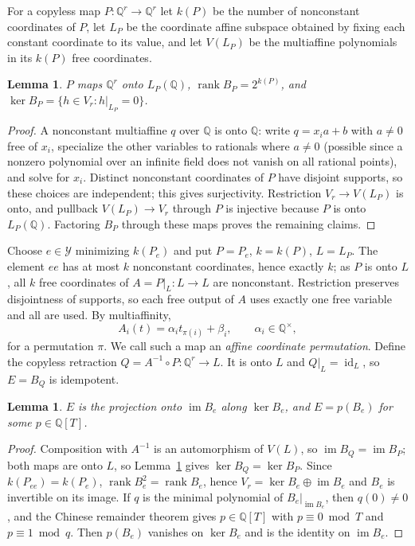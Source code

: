 \documentclass[acmlarge,screen,11pt,nonacm,natbib=false]{acmart}
\newcommand{\Q}{\mathbb{Q}}
\newcommand{\cY}{\mathcal{Y}}
\newcommand{\im}{\operatorname{im}}
\newcommand{\id}{\operatorname{id}}
\newtheorem{lemma}[theorem]{Lemma}
\theoremstyle{definition}
\begin{document}
For a copyless map $P:\Q^r\to\Q^r$ let $k(P)$ be the number of nonconstant coordinates of $P$, let $L_P$ be the coordinate affine subspace obtained by fixing each constant coordinate to its value, and let $V(L_P)$ be the multiaffine polynomials in its $k(P)$ free coordinates.

\begin{lemma}\label{lem:image}
$P$ maps $\Q^r$ onto $L_P(\Q)$, $\operatorname{rank}B_P=2^{k(P)}$, and $\ker B_P=\{h\in V_r:h|_{L_P}=0\}$.
\end{lemma}
\begin{proof}
A nonconstant multiaffine $q$ over $\Q$ is onto $\Q$: write $q=x_ia+b$ with $a\ne0$ free of $x_i$, specialize the other variables to rationals where $a\ne0$ (possible since a nonzero polynomial over an infinite field does not vanish on all rational points), and solve for $x_i$. Distinct nonconstant coordinates of $P$ have disjoint supports, so these choices are independent; this gives surjectivity. Restriction $V_r\to V(L_P)$ is onto, and pullback $V(L_P)\to V_r$ through $P$ is injective because $P$ is onto $L_P(\Q)$. Factoring $B_P$ through these maps proves the remaining claims.
\end{proof}

Choose $e\in\cY$ minimizing $k(P_e)$ and put $P=P_e$, $k=k(P)$, $L=L_P$. The element $ee$ has at most $k$ nonconstant coordinates, hence exactly $k$; as $P$ is onto $L$, all $k$ free coordinates of $A=P|_L:L\to L$ are nonconstant. Restriction preserves disjointness of supports, so each free output of $A$ uses exactly one free variable and all are used. By multiaffinity,
\begin{equation}\label{eq:affineperm}
 A_i(t)=\alpha_it_{\pi(i)}+\beta_i,\qquad\alpha_i\in\Q^\times,
\end{equation}
for a permutation $\pi$. We call such a map an \emph{affine coordinate permutation}. Define the copyless retraction $Q=A^{-1}\circ P:\Q^r\to L$. It is onto $L$ and $Q|_L=\id_L$, so $E=B_Q$ is idempotent.

\begin{lemma}\label{lem:projection}
$E$ is the projection onto $\im B_e$ along $\ker B_e$, and $E=p(B_e)$ for some $p\in\Q[T]$.
\end{lemma}
\begin{proof}
Composition with $A^{-1}$ is an automorphism of $V(L)$, so $\im B_Q=\im B_P$; both maps are onto $L$, so Lemma~\ref{lem:image} gives $\ker B_Q=\ker B_P$. Since $k(P_{ee})=k(P_e)$, $\operatorname{rank}B_e^2=\operatorname{rank}B_e$, hence $V_r=\ker B_e\oplus\im B_e$ and $B_e$ is invertible on its image. If $q$ is the minimal polynomial of $B_e|_{\im B_e}$, then $q(0)\ne0$, and the Chinese remainder theorem gives $p\in\Q[T]$ with $p\equiv0\bmod T$ and $p\equiv1\bmod q$. Then $p(B_e)$ vanishes on $\ker B_e$ and is the identity on $\im B_e$.
\end{proof}
\end{document}
